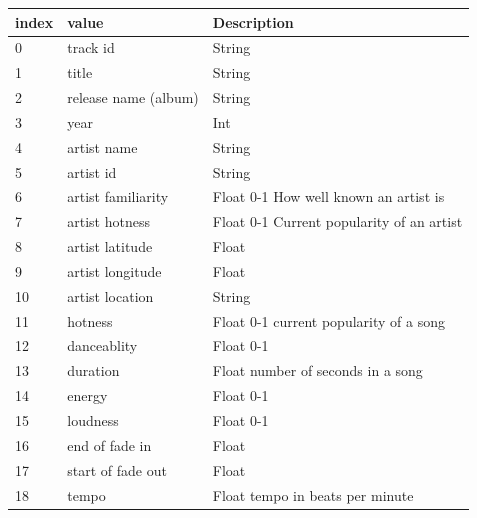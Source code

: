 \documentclass[letterpaper,10pt,openany,oneside]{sphinxmanual}
\begin{document}
\begin{tabulary}{\linewidth}{|L|L|L|}
\hline
\textbf{
index
} & \textbf{
value
} & \textbf{
Description
}\\\hline

0
 & 
track id
 & 
String
\\\hline

1
 & 
title
 & 
String
\\\hline

2
 & 
release name (album)
 & 
String
\\\hline

3
 & 
year
 & 
Int
\\\hline

4
 & 
artist name
 & 
String
\\\hline

5
 & 
artist id
 & 
String
\\\hline

6
 & 
artist familiarity
 & 
Float 0-1 How well known an artist is
\\\hline

7
 & 
artist hotness
 & 
Float 0-1 Current popularity of an artist
\\\hline

8
 & 
artist latitude
 & 
Float
\\\hline

9
 & 
artist longitude
 & 
Float
\\\hline

10
 & 
artist location
 & 
String
\\\hline

11
 & 
hotness
 & 
Float 0-1 current popularity of a song
\\\hline

12
 & 
danceablity
 & 
Float 0-1
\\\hline

13
 & 
duration
 & 
Float number of seconds in a song
\\\hline

14
 & 
energy
 & 
Float 0-1
\\\hline

15
 & 
loudness
 & 
Float 0-1
\\\hline

16
 & 
end of fade in
 & 
Float
\\\hline

17
 & 
start of fade out
 & 
Float
\\\hline

18
 & 
tempo
 & 
Float tempo in beats per minute
\\\hline


\end{tabulary}
\end{document}
